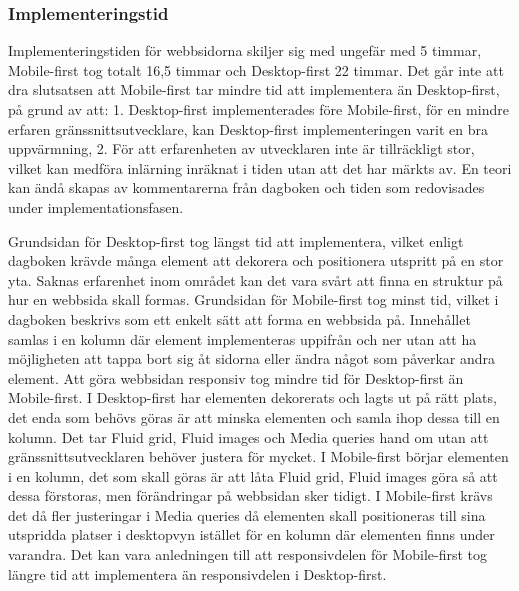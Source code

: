 \documentclass[11pt]{article}
\begin{document}
\subsubsection{Implementeringstid}
Implementeringstiden för webbsidorna skiljer sig med ungefär med 5 timmar, Mobile-first tog totalt 16,5 timmar och Desktop-first 22 timmar. Det går inte att dra slutsatsen att Mobile-first tar mindre tid att implementera än Desktop-first, på grund av att: 1. Desktop-first implementerades före Mobile-first, för en mindre erfaren gränssnittsutvecklare, kan Desktop-first implementeringen varit en bra uppvärmning, 2. För att erfarenheten av utvecklaren inte är tillräckligt stor, vilket kan medföra inlärning inräknat i tiden utan att det har märkts av. En teori kan ändå skapas av kommentarerna från dagboken och tiden som redovisades under implementationsfasen.

Grundsidan för Desktop-first tog längst tid att implementera, vilket enligt dagboken krävde många element att dekorera och positionera utspritt på en stor yta. Saknas erfarenhet inom området kan det vara svårt att finna en struktur på hur en webbsida skall formas. Grundsidan för Mobile-first tog minst tid, vilket i dagboken beskrivs som ett enkelt sätt att forma en webbsida på. Innehållet samlas i en kolumn där element implementeras uppifrån och ner utan att ha möjligheten att tappa bort sig åt sidorna eller ändra något som påverkar andra element. Att göra webbsidan responsiv tog mindre tid för Desktop-first än Mobile-first. I Desktop-first har elementen dekorerats och lagts ut på rätt plats, det enda som behövs göras är att minska elementen och samla ihop dessa till en kolumn. Det tar Fluid grid, Fluid images och Media queries hand om utan att gränssnittsutvecklaren behöver justera för mycket. I Mobile-first börjar elementen i en kolumn, det som skall göras är att låta Fluid grid, Fluid images göra så att dessa förstoras, men förändringar på webbsidan sker tidigt. I Mobile-first krävs det då fler justeringar i Media queries då elementen skall positioneras till sina utspridda platser i desktopvyn istället för en kolumn där elementen finns under varandra. Det kan vara anledningen till att responsivdelen för Mobile-first tog längre tid att implementera än responsivdelen i Desktop-first.
\end{document}

